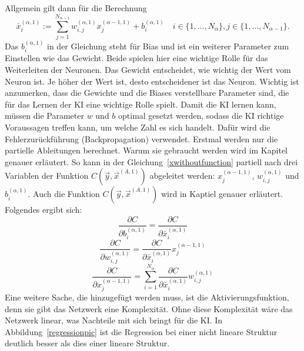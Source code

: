 \documentclass[11pt]{article}
\begin{document}
Allgemein gilt dann für die Berechnung
\begin{equation}
    \label{xwithoutfunction}
    \bar{x}_{i}^{(\alpha,1)} := \sum_{j=1}^{N_{\alpha-1}} w_{i,j}^{(\alpha,1)} x_{j}^{(\alpha-1,1)} + b_{i}^{(\alpha,1)} \quad i \in \{1,\ldots,N_{\alpha}\}, j \in \{1,\ldots,N_{\alpha-1}\}.
\end{equation}
Das $ b_{i}^{(\alpha,1)} $ in der Gleichung steht für Bias und ist ein weiterer Parameter zum Einstellen wie das Gewicht. Beide spielen hier eine wichtige Rolle
für das Weiterleiten der Neuronen. Das Gewicht entscheidet, wie wichtig der Wert vom Neuron ist. Je höher der Wert ist, desto entscheidener
ist das Neuron. Wichtig ist anzumerken, dass die Gewichte und die Biases verstellbare Parameter sind, die für das Lernen der KI eine wichtige Rolle
spielt. Damit die KI lernen kann, müssen die Parameter $w$ und $b$ optimal gesetzt werden, sodass die KI richtige Voraussagen treffen kann, um welche Zahl es sich handelt.
Dafür wird die Fehlerzurückführung (Backpropagation) verwendet. Erstmal werden nur die partielle Ableitungen berechnet. Warum sie gebraucht werden wird im Kapitel  genauer
erläutert. So kann in der Gleichung~\ref{xwithoutfunction} partiell nach drei Variablen der Funktion $C(\vec{y},\vec{x}^{(A,1)})$ abgeleitet werden: $x_{j}^{(\alpha-1,1)}$, $w_{i,j}^{(\alpha,1)}$ und $b_{i}^{(\alpha,1)}$.
Auch die Funktion $C(\vec{y},\vec{x}^{(A,1)})$ wird in Kaptiel  genauer erläutert.
Folgendes ergibt sich:
\begin{equation}
    \frac{\partial C}{\partial b_i^{(\alpha,1)}} = \frac{\partial C}{\partial \bar{x}_i^{(\alpha,1)}}
\end{equation}
\begin{equation}
    \frac{\partial C}{\partial w_{i,j}^{(\alpha,1)}} = \frac{\partial C}{\partial \bar{x}_i^{(\alpha,1)}} x_j^{(\alpha-1,1)}
    \label{w}
\end{equation}
\begin{equation}
    \frac{\partial C}{\partial x_{j}^{(\alpha-1,1)}} = \sum_{i=1}^{N_{\alpha}} \frac{\partial C}{\partial \bar{x}_i^{(\alpha,1)}} w_{i,j}^{(\alpha,1)}
\end{equation}
Eine weitere Sache, die hinzugefügt werden muss, ist die Aktivierungsfunktion, denn sie gibt das Netzwerk eine Komplexität.
Ohne diese Komplexität wäre das Netzwerk linear, was Nachteile mit sich bringt für die KI. In Abbildung~\ref{regressionpic} ist die Regression bei einer
nicht lineare Struktur deutlich besser als dies einer lineare Struktur.
\end{document}
